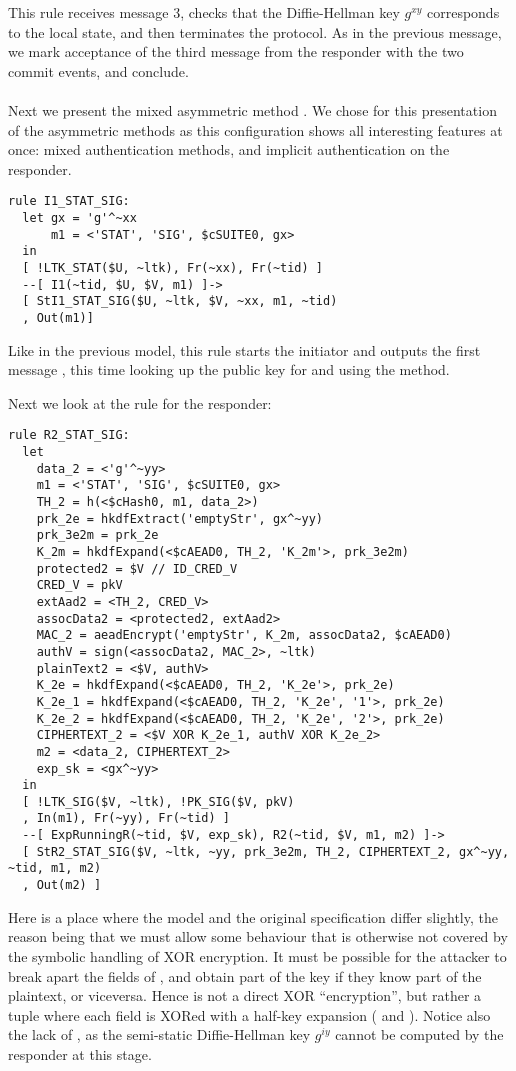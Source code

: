 This rule receives message 3, checks that the
Diffie-Hellman key $g^{xy}$ corresponds to the local state, and then terminates
the protocol.  As in
the previous message, we mark acceptance of the third message from the responder
with the two commit events, and conclude.

\paragraph{\mStatSig{}}
Next we present the mixed asymmetric method \mStatSig. We chose \mStatSig{} for
this presentation of the asymmetric methods as this configuration shows all
interesting features at once: mixed authentication methods, and implicit
authentication on the responder.

\begin{lstlisting}
rule I1_STAT_SIG:
  let gx = 'g'^~xx
      m1 = <'STAT', 'SIG', $cSUITE0, gx> 
  in
  [ !LTK_STAT($U, ~ltk), Fr(~xx), Fr(~tid) ]
  --[ I1(~tid, $U, $V, m1) ]->
  [ StI1_STAT_SIG($U, ~ltk, $V, ~xx, m1, ~tid) 
  , Out(m1)]
\end{lstlisting}
Like in the previous model, this rule starts the initiator and outputs the first
message , this time looking up the public key for  and using the
\mStatSig{} method.

Next we look at the rule for the responder:
\begin{lstlisting}
rule R2_STAT_SIG:
  let
    data_2 = <'g'^~yy>
    m1 = <'STAT', 'SIG', $cSUITE0, gx> 
    TH_2 = h(<$cHash0, m1, data_2>)
    prk_2e = hkdfExtract('emptyStr', gx^~yy)
    prk_3e2m = prk_2e
    K_2m = hkdfExpand(<$cAEAD0, TH_2, 'K_2m'>, prk_3e2m)
    protected2 = $V // ID_CRED_V
    CRED_V = pkV
    extAad2 = <TH_2, CRED_V> 
    assocData2 = <protected2, extAad2>
    MAC_2 = aeadEncrypt('emptyStr', K_2m, assocData2, $cAEAD0)
    authV = sign(<assocData2, MAC_2>, ~ltk)
    plainText2 = <$V, authV>
    K_2e = hkdfExpand(<$cAEAD0, TH_2, 'K_2e'>, prk_2e)
    K_2e_1 = hkdfExpand(<$cAEAD0, TH_2, 'K_2e', '1'>, prk_2e)
    K_2e_2 = hkdfExpand(<$cAEAD0, TH_2, 'K_2e', '2'>, prk_2e)
    CIPHERTEXT_2 = <$V XOR K_2e_1, authV XOR K_2e_2> 
    m2 = <data_2, CIPHERTEXT_2>
    exp_sk = <gx^~yy>
  in
  [ !LTK_SIG($V, ~ltk), !PK_SIG($V, pkV)
  , In(m1), Fr(~yy), Fr(~tid) ]
  --[ ExpRunningR(~tid, $V, exp_sk), R2(~tid, $V, m1, m2) ]->
  [ StR2_STAT_SIG($V, ~ltk, ~yy, prk_3e2m, TH_2, CIPHERTEXT_2, gx^~yy, ~tid, m1, m2) 
  , Out(m2) ]
\end{lstlisting}
Here is a place where the model and the original specification differ
slightly, the reason being that we must allow some behaviour that is
otherwise not covered by the symbolic handling of XOR encryption. It must
be possible for the attacker to break apart the fields of
, and obtain part of the key 
if they know part of the plaintext, or viceversa.
%
Hence  is not a direct XOR ``encryption'', but rather a tuple
where each field is XORed with a half-key expansion ( and
).  Notice also the lack of , as the semi-static
Diffie-Hellman key $g^{iy}$ cannot be computed by the responder at this stage.

